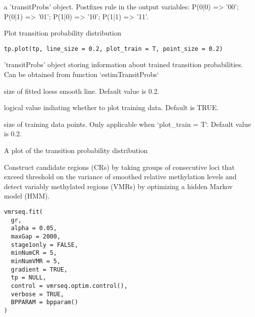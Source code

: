 \documentclass[letterpaper]{book}
\begin{document}
%
\begin{Value}
a 'transitProbs' object. Postfixes rule in the output variables:
P(0|0) => '00'; P(0|1) => '01'; P(1|0) => '10'; P(1|1) => '11'.
\end{Value}
%
\begin{Description}
Plot transition probability distribution
\end{Description}
%
\begin{Usage}
\begin{verbatim}
tp.plot(tp, line_size = 0.2, plot_train = T, point_size = 0.2)
\end{verbatim}
\end{Usage}
%
\begin{Arguments}
\begin{ldescription}
\item[\code{tp}] 'transitProbs' object storing information about trained transition
probabilities. Can be obtained from function `estimTransitProbs`

\item[\code{line\_size}] size of fitted loess smooth line. Default value is 0.2.

\item[\code{plot\_train}] logical value indiating whether to plot training data.
Default is TRUE.

\item[\code{point\_size}] size of training data points. Only applicable when
`plot\_train = T`. Default value is 0.2.
\end{ldescription}
\end{Arguments}
%
\begin{Value}
A plot of the transition probability distribution
\end{Value}
%
\begin{Description}
Construct candidate regions (CRs) by taking groups of consecutive loci that exceed
threshold on the variance of smoothed relative methylation levels and detect
variably methylated regions (VMRs) by optimizing a hidden Markov model (HMM).
\end{Description}
%
\begin{Usage}
\begin{verbatim}
vmrseq.fit(
  gr,
  alpha = 0.05,
  maxGap = 2000,
  stage1only = FALSE,
  minNumCR = 5,
  minNumVMR = 5,
  gradient = TRUE,
  tp = NULL,
  control = vmrseq.optim.control(),
  verbose = TRUE,
  BPPARAM = bpparam()
)
\end{verbatim}
\end{Usage}
\end{document}
